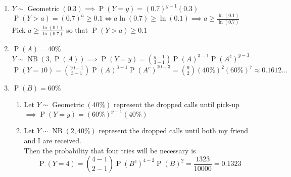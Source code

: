 \documentclass{article}
\newcommand{\pr}[1]{\operatorname{P}(#1)}
\newcommand{\geodist}[2]{#1 \sim \operatorname{Geometric}(#2)}
\newcommand{\nbinomdist}[3]{#1 \sim \operatorname{NB}(#2, #3)}
\newtheorem*{theorem}{Theorem}
\begin{document}
\begin{enumerate}
\begin{enumerate}
    \item \begin{theorem}
      $\pr{Y = a+k \mid Y > a} = \pr{Y = k}$
      \begin{proof}
        \begin{align*}
          & \pr{Y=k} = (1-p)^{k-1}p\\
          & \pr{Y = a+k \mid Y > a} = \frac{\pr{Y=a+k \cap Y > a}}{\pr{Y>a}} = 
          \frac{\pr{Y=a+k \cap (Y = a + 1 \cup Y = a + 2 \ldots \cup \ldots Y = a+k)}}{\pr{Y>a}}\\
          & = \frac{\pr{Y=a+k}}{\pr{Y > a}} = \frac{(1-p)^{a+k-1}p}{(1-p)^{a}} = (1-p)^{k-1}p\\
          & \therefore \pr{Y = a+k \mid Y > a} = \pr{Y = k} = (1-p)^{k-1}p
        \end{align*}
      \end{proof}
    \end{theorem}
  \end{enumerate}

  \item $\geodist{Y}{0.3} \implies \pr{Y=y} = (0.7)^{y-1}(0.3)$\\
  $\pr{Y>a} = (0.7)^a \geq 0.1 \iff a\ln(0.7) \geq \ln(0.1) \implies a \geq \frac{\ln(0.1)}{\ln(0.7)}$\\
  Pick $a \geq \frac{\ln(0.1)}{\ln(0.7)}$ so that $\pr{Y>a} \geq 0.1$

  \item $\pr{A} = 40\%$\\
  $\nbinomdist{Y}{3}{\pr{A}} \implies \pr{Y=y} = \binom{y-1}{3-1}\pr{A}^{3-1}\pr{A^c}^{y-3}$\\
  $\pr{Y=10} = \binom{10-1}{3-1}\pr{A}^{3-1}\pr{A^c}^{10-3} = \binom{9}{2}(40\%)^2(60\%)^7 \approx 0.1612\ldots$

  \item $\pr{B} = 60\%$
  \begin{enumerate}
    \item Let $\geodist{Y}{40\%}$ represent the dropped calls until pick-up $\implies \pr{Y=y} = (60\%)^{y-1}(40\%)$\\
    \item Let $\nbinomdist{Y}{2}{40\%}$ represent the dropped calls until both my friend and I are received.\\
    Then the probability that four tries will be necessary is
    \[
      \pr{Y=4} = \binom{4-1}{2-1}\pr{B^c}^{4-2}\pr{B}^2 = \frac{1323}{10000} = 0.1323
    \]
  \end{enumerate}
  

\end{enumerate}
\end{document}
